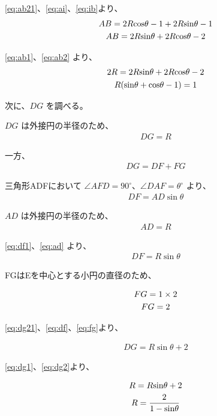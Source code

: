 \documentclass{jsarticle}
\begin{document}
\ref{eq:ab21}、\ref{eq:ai}、\ref{eq:ib}より、
\begin{gather}
 AB = 2R{\cos}{\theta} -1 + 2R{\sin}{\theta} -1 \notag \\
 AB = 2R{\sin}{\theta} + 2R{\cos}{\theta} - 2 \label{eq:ab2}
\end{gather}

\ref{eq:ab1}、\ref{eq:ab2} より、
\begin{gather}
 2R = 2R{\sin}{\theta} + 2R{\cos}{\theta} - 2 \notag \\
 R({\sin}{\theta} + {\cos}{\theta} - 1) = 1 \label{eq:ab}
\end{gather}

次に、$DG$ を調べる。

$DG$ は外接円の半径のため、
\begin{gather}
 DG = R \label{eq:dg1}
\end{gather}

一方、
\begin{gather}
 DG = DF + FG \label{eq:dg21}
\end{gather}

三角形ADFにおいて ${\angle}AFD=90^{\circ}$、${\angle}DAF={\theta}^{\circ}$ より、
\begin{gather}
 DF = AD{\sin}{\theta} \label{eq:df1}
\end{gather}

$AD$ は外接円の半径のため、
\begin{gather}
 AD = R \label{eq:ad}
\end{gather}

\ref{eq:df1}、\ref{eq:ad} より、
\begin{gather}
 DF = R{\sin}{\theta} \label{eq:df}
\end{gather}

FGはEを中心とする小円の直径のため、

\begin{gather}
 FG = 1 \times 2 \notag \\
 FG = 2 \label{eq:fg}
\end{gather}

\ref{eq:dg21}、\ref{eq:df}、\ref{eq:fg}より、

\begin{gather}
 DG = R{\sin}{\theta} + 2 \label{eq:dg2}
\end{gather}

\ref{eq:dg1}、\ref{eq:dg2}より、

\begin{gather}
 R = R{\sin}{\theta} + 2 \notag \\
 R = \frac{2}{1 - {\sin}{\theta}} \label{eq:dg}
\end{gather}
\end{document}
